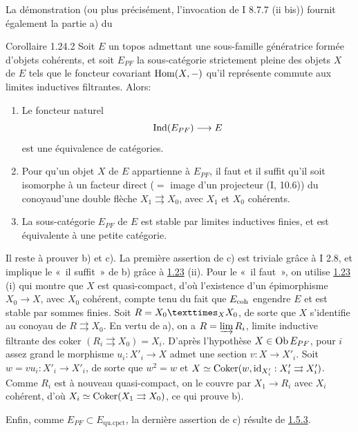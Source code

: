 \documentclass[10pt]{../fichiers-configuration-latex/smfart}
\begin{document}
La démonstration (ou plus précisément, l'invocation de I 8.7.7 (ii
bis)) fournit également la partie a) du

\begin{enonce*}{Corollaire 1.24.2}
Soit $E$ un topos admettant une sous-famille génératrice formée
d'objets cohérents, et soit $E_{PF}$ la sous-catégorie strictement
pleine des objets $X$ de $E$ tels que le foncteur covariant $\operatorname{Hom}(X,
-)$ qu'il représente commute aux limites inductives filtrantes.
Alors:
\begin{enumerate}
\renewcommand{\theenumi}{\alph{enumi}}
\renewcommand{\labelenumi}{\theenumi)}
\item Le foncteur naturel
$$
\Ind (E_{PF}) \to E
$$
est une équivalence de catégories.

\item Pour qu'un objet $X$ de $E$ appartienne à $E_{PF}$, il faut et
  il suffit qu'il soit isomorphe à un facteur direct ($=$ image d'un
  projecteur (I, 10.6)) du conoyau\pageoriginale d'une double flèche $X_1
  \rightrightarrows X_0$, avec $X_1$ et $X_0$ cohérents.
\item La sous-catégorie $E_{PF}$ de $E$ est stable par limites
  inductives finies, et est équivalente à une petite catégorie.
\end{enumerate}
\end{enonce*}

Il reste à prouver b) et c). La première assertion de c) est triviale
grâce à I 2.8, et implique le « il suffit » de b) grâce à \hyperref[VI.thm1.23]{1.23}
(ii). Pour le « il faut », on utilise \hyperref[VI.thm1.23]{1.23} (i) qui montre que $X$
est quasi-compact, d'où l'existence d'un épimorphisme $X_{0} \to X$, avec
$X_0$ cohérent, compte tenu du fait que $E_{\mathrm{coh}}$ engendre $E$ et est
stable par sommes finies. Soit $R = \fprod{X_0}{X_0}{X}$, de sorte que
$X$ s'identifie au conoyau de $R \rightrightarrows X_0$. En vertu de
a), on a $R = \varinjlim R_i$, limite inductive filtrante des coker
$(R_i \rightrightarrows X_0) = X_i$. D'après l'hypothèse $X \in \operatorname{Ob}
E_{PF}$, pour $i$ assez grand le morphisme $u_i : X'_i \to X$ admet
une section $v : X \to X'_i$. Soit $w = vu_i : X'_i \to
X'_i$, de sorte que $w^2 = w$ et $X \simeq \operatorname{Coker} (w, \operatorname{id}_{X'_i}
: X'_i \rightrightarrows X'_i)$. Comme $R_i$ est à nouveau
quasi-compact, on le couvre par $X_{1} \to R_i$ avec $X_i$
cohérent, d'où $X_i \simeq \operatorname{Coker} (X_1 \rightrightarrows X_0)$, ce qui
prouve b).

Enfin, comme $E_{PF}\subset E_{\text{qu.cpct}}$, la dernière assertion de c)
résulte de \hyperref[VI.subsubsec1.5.3]{1.5.3}.
\end{document}
